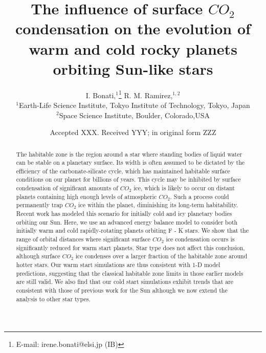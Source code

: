 \documentclass[fleqn,usenatbib]{mnras}
\title[$CO_{\mathrm{2}}$ condensation on rocky planets]{The influence of surface $CO_{\mathrm{2}}$ condensation on the evolution of warm and cold rocky planets orbiting Sun-like stars}
\author[I. Bonati and R. Ramirez]{
I. Bonati,$^{1}$\thanks{E-mail: irene.bonati@elsi.jp (IB)}
R. M. Ramirez,$^{1,2}$
\\
$^{1}$Earth-Life Science Institute, Tokyo Institute of Technology, Tokyo, Japan\\
$^{2}$Space Science Institute, Boulder, Colorado,USA\\
}
\date{Accepted XXX. Received YYY; in original form ZZZ}
\begin{document}
\newcommand{\add}[1]{\textcolor{greenblue}{#1}}
\newcommand{\irene}[1]{\textcolor{greenblue}{\textit{(Irene: #1)}}}
\newcommand{\ramses}[1]{\textcolor{greenish}{\textit{(Ramses: #1)}}}
\newcommand{\todo}[1]{\textcolor{red}{#1}}
\newcommand{\textb}[1]{\textcolor{greenblue}{#1}}
\newcommand{\textg}[1]{\textcolor{greenish}{#1}}
\label{firstpage}
\pagerange{\pageref{firstpage}--\pageref{lastpage}}
\maketitle

\begin{abstract}
The habitable zone is the region around a star where standing bodies of liquid water can be stable on a planetary surface. Its width is often assumed to be dictated by the efficiency of the carbonate-silicate cycle, which has maintained habitable surface conditions on our planet for billions of years. This cycle may be inhibited by surface condensation of significant amounts of $CO_{\mathrm{2}}$ ice, which is likely to occur on distant planets containing high enough levels of atmospheric $CO_{\mathrm{2}}$. Such a process could permanently trap $CO_{\mathrm{2}}$ ice within the planet, diminishing its long-term habitability. Recent work has modeled this scenario for initially cold and icy planetary bodies orbiting our Sun. Here, we use an advanced energy balance model to consider both initially warm and cold rapidly-rotating planets orbiting F - K stars. We show that the range of orbital distances where significant surface $CO_{\mathrm{2}}$ ice condensation occurs is significantly reduced for warm start planets. Star type does not affect this conclusion, although surface $CO_{\mathrm{2}}$ ice condenses over a larger fraction of the habitable zone around hotter stars. Our warm start simulations are thus consistent with 1-D model predictions, suggesting that the classical habitable zone limits in those earlier models are still valid. We also find that our cold start simulations exhibit trends that are consistent with those of previous work for the Sun although we now extend the analysis to other star types.    
\end{abstract}
\end{document}
